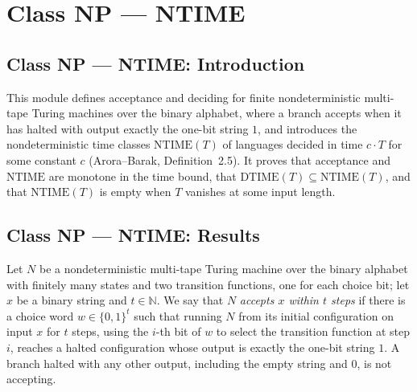 \section{Class NP --- NTIME}
\subsection*{Class NP --- NTIME: Introduction}

This module defines acceptance and deciding for finite nondeterministic multi-tape
Turing machines over the binary alphabet, where a branch accepts when it has halted
with output exactly the one-bit string $1$, and introduces the nondeterministic time
classes $\mathrm{NTIME}(T)$ of languages decided in time $c \cdot T$ for some constant
$c$ (Arora--Barak, Definition~2.5). It proves that acceptance and $\mathrm{NTIME}$ are
monotone in the time bound, that $\mathrm{DTIME}(T) \subseteq \mathrm{NTIME}(T)$, and
that $\mathrm{NTIME}(T)$ is empty when $T$ vanishes at some input length.

\subsection*{Class NP --- NTIME: Results}

\begin{definition}
\label{Turing.FinNDTM.AcceptsWithin}
\leanok
{}
Let $N$ be a nondeterministic multi-tape Turing machine over the binary alphabet with
finitely many states and two transition functions, one for each choice bit; let $x$ be
a binary string and $t \in \mathbb{N}$. We say that $N$ \emph{accepts $x$ within $t$
steps} if there is a choice word $w \in \{0,1\}^t$ such that running $N$ from its
initial configuration on input $x$ for $t$ steps, using the $i$-th bit of $w$ to select
the transition function at step $i$, reaches a halted configuration whose output is
exactly the one-bit string $1$. A branch halted with any other output, including the
empty string and $0$, is not accepting.
\end{definition}

